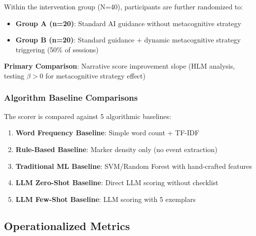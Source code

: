 \documentclass[11pt]{article}
\begin{document}
Within the intervention group (N=40), participants are further randomized to:
\begin{itemize}
    \item \textbf{Group A (n=20)}: Standard AI guidance without metacognitive strategy
    \item \textbf{Group B (n=20)}: Standard guidance + dynamic metacognitive strategy triggering (50\% of sessions)
\end{itemize}

\textbf{Primary Comparison}: Narrative score improvement slope (HLM analysis, testing $\beta > 0$ for metacognitive strategy effect)

\subsubsection{Algorithm Baseline Comparisons}

The scorer is compared against 5 algorithmic baselines:
\begin{enumerate}
    \item \textbf{Word Frequency Baseline}: Simple word count + TF-IDF
    \item \textbf{Rule-Based Baseline}: Marker density only (no event extraction)
    \item \textbf{Traditional ML Baseline}: SVM/Random Forest with hand-crafted features
    \item \textbf{LLM Zero-Shot Baseline}: Direct LLM scoring without checklist
    \item \textbf{LLM Few-Shot Baseline}: LLM scoring with 5 exemplars
\end{enumerate}

\subsection{Operationalized Metrics}
\end{document}
